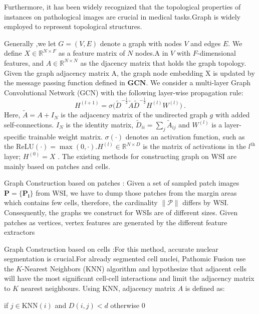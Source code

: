 \documentclass[journal,twoside,web]{ieeecolor}
\begin{document}
Furthermore, it has been widely recognized that the topological properties of instances on pathological images are crucial in medical tasks.Graph is widely employed to represent topological structures.

Generally ,we let $G=(V,E)$ denote a graph with nodes $V$ and edges $E.$ We define $X\in\mathbb{R}^{N\times F}$ as a feature matrix of $N$ nodes.A in $V$ with $F$-dimensional features, and $A\in\mathbb{R}^{N\times N}$ as the djacency matrix that holds the graph topology. 
Given the graph adjacency matrix A, the graph node embedding X is updated by the message passing function defined in $\mathbf{GCN}$. We consider a multi-layer Graph Convolutional Network (GCN) with the following layer-wise propagation rule\cite{kipf2016semi}:
$$
H^{(l+1)}=\sigma\Big(\tilde{D}^{-\frac12}\tilde{A}\tilde{D}^{-\frac12}H^{(l)}W^{(l)}\Big)\:.
$$
 Here, $\tilde{A}=A+I_N$ is the adjacency matrix of the undirected graph $g$ with added self-connections. $I_N$ is the identity matrix, $\tilde{D} _{ii}= \sum _j\tilde{A} _{ij}$ and $W^{( l) }$ is a layer-specific trainable weight matrix. $\sigma(\cdot)$ denotes an activation function, such as the ReLU$( \cdot ) = \max ( 0, \cdot ) .H^{( l) }\in \mathbb{R} ^{N\times D}$ is the matrix of activations in the $l^\mathrm{th}$ layer; $H^{(0)}=X$ . The existing methods for constructing graph on WSI are mainly based on patches and cells.

Graph Construction based on patches : Given a set of sampled patch images $\mathbf{P}=\{\mathbf{P_i}\}$ from WSI, we have to dump those patches from the margin areas which contains few cells, therefore, the cardinality $\|\mathcal{P}\|$ differs by WSI. Consequently, the graphs we construct for WSIs are of different sizes. Given patches as vertices, vertex features are generated by the different feature extractors


Graph Construction based on cells :For this method, accurate nuclear segmentation is crucial.For already segmented cell nuclei, Pathomic Fusion\cite{chen2020pathomic} use the $K$-Nearest Neighbors (KNN) algorithm and hypothesize that adjacent cells will have the most significant cell-cell interactions and limit the adjacency matrix to $K$ nearest neighbours. Using KNN, adjacency matrix $A$ is defined as: 

if $j\in $KNN$( i) $ and $D(i,j)<d$  otherwise 0
\end{document}
